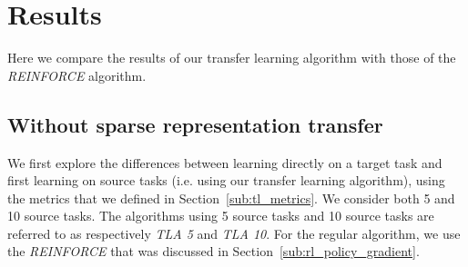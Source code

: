 \section{Results}
Here we compare the results of our transfer learning algorithm with those of the \textit{REINFORCE} algorithm.
\subsection{Without sparse representation transfer} %
\label{sub:cartpole:without_sparse_representation_transfer}
We first explore the differences between learning directly on a target task and first learning on source tasks (i.e. using our transfer learning algorithm), using the metrics that we defined in Section~\ref{sub:tl_metrics}. We consider both 5 and 10 source tasks. The algorithms using 5 source tasks and 10 source tasks are referred to as respectively \textit{TLA 5} and \textit{TLA 10}.
For the regular algorithm, we use the \textit{REINFORCE} that was discussed in Section~\ref{sub:rl_policy_gradient}.

